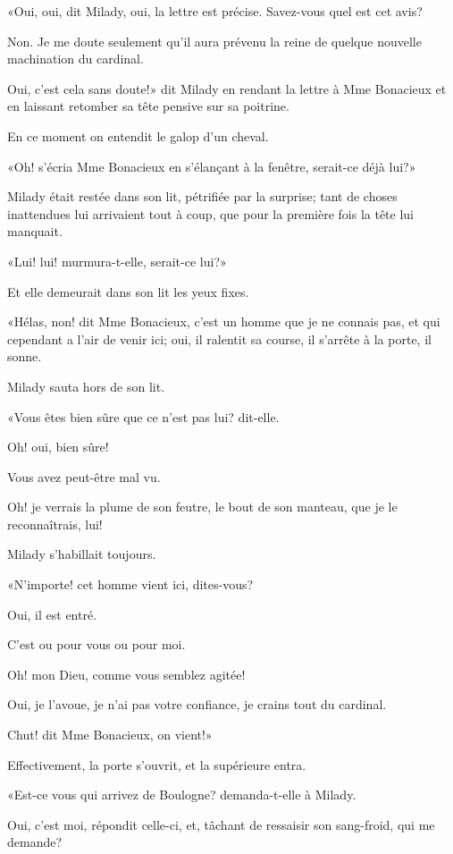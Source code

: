 «Oui, oui, dit Milady, oui, la lettre est précise. Savez-vous quel est cet avis? 

\speak  Non. Je me doute seulement qu'il aura prévenu la reine de quelque nouvelle machination du cardinal. 

\speak  Oui, c'est cela sans doute!» dit Milady en rendant la lettre à Mme Bonacieux et en laissant retomber sa tête pensive sur sa poitrine. 

En ce moment on entendit le galop d'un cheval. 

«Oh! s'écria Mme Bonacieux en s'élançant à la fenêtre, serait-ce déjà lui?» 

Milady était restée dans son lit, pétrifiée par la surprise; tant de choses inattendues lui arrivaient tout à coup, que pour la première fois la tête lui manquait. 

«Lui! lui! murmura-t-elle, serait-ce lui?» 

Et elle demeurait dans son lit les yeux fixes. 

«Hélas, non! dit Mme Bonacieux, c'est un homme que je ne connais pas, et qui cependant a l'air de venir ici; oui, il ralentit sa course, il s'arrête à la porte, il sonne. 

Milady sauta hors de son lit. 

«Vous êtes bien sûre que ce n'est pas lui? dit-elle. 

\speak  Oh! oui, bien sûre! 

\speak  Vous avez peut-être mal vu. 

\speak  Oh! je verrais la plume de son feutre, le bout de son manteau, que je le reconnaîtrais, lui! 

Milady s'habillait toujours. 

«N'importe! cet homme vient ici, dites-vous? 

\speak  Oui, il est entré. 

\speak  C'est ou pour vous ou pour moi. 

\speak  Oh! mon Dieu, comme vous semblez agitée! 

\speak  Oui, je l'avoue, je n'ai pas votre confiance, je crains tout du cardinal. 

\speak  Chut! dit Mme Bonacieux, on vient!» 

Effectivement, la porte s'ouvrit, et la supérieure entra. 

«Est-ce vous qui arrivez de Boulogne? demanda-t-elle à Milady. 

\speak  Oui, c'est moi, répondit celle-ci, et, tâchant de ressaisir son sang-froid, qui me demande? 

